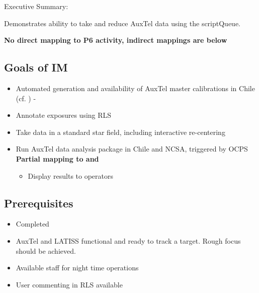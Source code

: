 
Executive Summary:

Demonstrates ability to take and reduce AuxTel data using the scriptQueue.

\textbf{No direct mapping to P6 activity, indirect mappings are below}

\subsection{Goals of IM}
\begin{itemize}
\item Automated generation and availability of AuxTel master calibrations in Chile (cf. ) - \textbf{}
\item Annotate exposures using \gls{RLS}
\item Take data in a standard star field, including interactive re-centering \textbf{}
\item Run AuxTel data analysis package in Chile and NCSA, triggered by \gls{OCPS} \textbf{Partial mapping to  and }
\begin{itemize}
\item Display results to operators %
\end{itemize}
\end{itemize}

\subsection{Prerequisites}
\begin{itemize}
	\item{ Completed}
	\item{AuxTel and LATISS functional and ready to track a target. Rough focus should be achieved.}
	\item{Available staff for night time operations}
	\item{User commenting in \gls{RLS} available}
\end{itemize}


